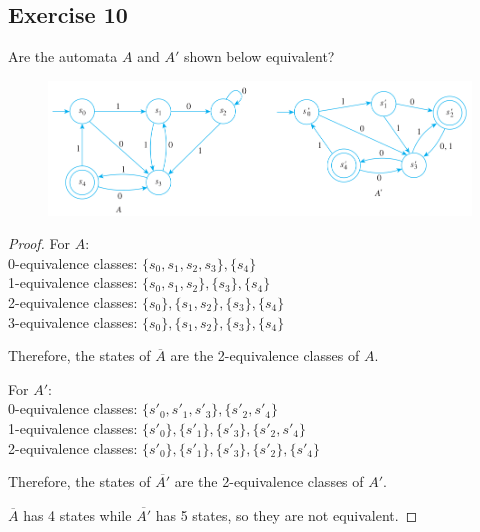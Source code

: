 \documentclass[14pt]{extarticle}
\begin{document}
\subsection{Exercise 10}
Are the automata \(A\) and \(A'\) shown below equivalent?

\begin{figure}[ht!]
    \centering
    \includegraphics[scale=0.5]{../images/12.3.10.png}
\end{figure}

\begin{proof}
    For \(A\): \\
    0-equivalence classes: \(\{s_0, s_1, s_2, s_3\}, \{s_4\}\) \\
    1-equivalence classes: \(\{s_0, s_1, s_2\}, \{s_3\}, \{s_4\}\) \\
    2-equivalence classes: \(\{s_0\}, \{s_1, s_2\}, \{s_3\}, \{s_4\}\) \\
    3-equivalence classes: \(\{s_0\}, \{s_1, s_2\}, \{s_3\}, \{s_4\}\)

    Therefore, the states of \(\overline{A}\) are the 2-equivalence classes of \(A\).

    For \(A'\): \\
    0-equivalence classes: \(\{s'_0, s'_1, s'_3\}, \{s'_2, s'_4\}\) \\
    1-equivalence classes: \(\{s'_0\}, \{s'_1\}, \{s'_3\}, \{s'_2, s'_4\}\) \\
    2-equivalence classes: \(\{s'_0\}, \{s'_1\}, \{s'_3\}, \{s'_2\}, \{s'_4\}\)

    Therefore, the states of \(\overline{A'}\) are the 2-equivalence classes of \(A'\).

    \(\overline{A}\) has 4 states while \(\overline{A'}\) has 5 states, so they are not equivalent.
\end{proof}
\end{document}
